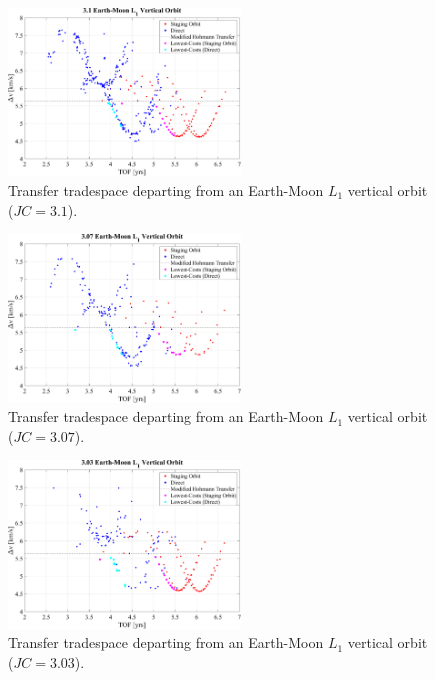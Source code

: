 \begin{figure}[ht]
    \centering
    \includegraphics[width=0.55\textwidth]{figures/TradeSpace_L1Vertical_3_10.pdf}
    \caption{Transfer tradespace departing from an Earth-Moon $L_{1}$ vertical orbit ($JC=3.1$).}
\end{figure}

\begin{figure}[ht]
    \centering
    \includegraphics[width=0.55\textwidth]{figures/TradeSpace_L1Vertical_3_07.pdf}
    \caption{Transfer tradespace departing from an Earth-Moon $L_{1}$ vertical orbit ($JC=3.07$).}
\end{figure}

\begin{figure}[ht]
    \centering
    \includegraphics[width=0.55\textwidth]{figures/TradeSpace_L1Vertical_3_03.pdf}
    \caption{Transfer tradespace departing from an Earth-Moon $L_{1}$ vertical orbit ($JC=3.03$).}
\end{figure}

